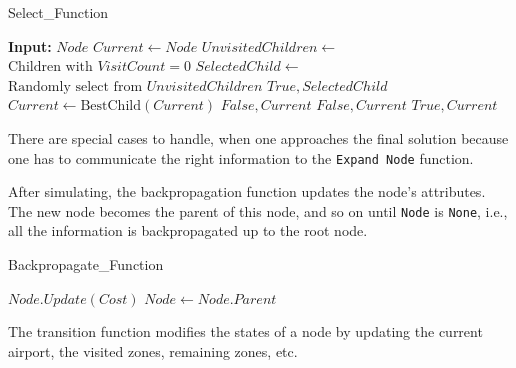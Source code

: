 \documentclass[conference]{IEEEtran}
\begin{document}
\begin{algorithm}[H]
    \caption{Select\_Function}
    \label{alg:SelectFunction}
    \begin{algorithmic}[1]
        \STATE \textbf{Input:} $Node$
        \STATE $Current \leftarrow Node$
        \STATE $UnvisitedChildren \leftarrow$ \\ $\text{Children with } VisitCount = 0$
        \STATE $SelectedChild \leftarrow$ \\ $\text{Randomly select from } UnvisitedChildren$
        \RETURN $True, SelectedChild$
        \ENDIF
        \ELSE
        \STATE $Current \leftarrow \text{BestChild}(Current)$
        \ENDIF
        \ENDWHILE
        \RETURN $False, Current$
        \RETURN $False, Current$
        \RETURN $True, Current$
        \ENDIF
    \end{algorithmic}
\end{algorithm}

There are special cases to handle, when one approaches the final solution because one has to communicate the right information to the \texttt{Expand Node} function.

After simulating, the backpropagation function updates the node's attributes. The new node becomes the parent of this node, and so on until \texttt{Node} is \texttt{None}, i.e., all the information is backpropagated up to the root node.

\begin{algorithm}
    \caption{Backpropagate\_Function}
    \label{alg:Backpropagate}
    \begin{algorithmic}[1]
        \STATE $Node.Update(Cost)$
        \STATE $Node \leftarrow Node.Parent$
        \ENDWHILE
    \end{algorithmic}
\end{algorithm}

The transition function modifies the states of a node by updating the current airport, the visited zones, remaining zones, etc.
\end{document}
